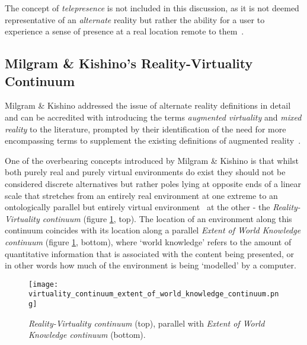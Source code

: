 The concept of \textit{telepresence} is not included in this discussion, as it is not deemed representative of an \textit{alternate} reality but rather the ability for a user to experience a sense of presence at a real location remote to them~\cite{Sheridan1992a}.


\subsection{Milgram \& Kishino's Reality-Virtuality Continuum}
\label{milgram&kishino}
Milgram \& Kishino addressed the issue of alternate reality definitions in detail and can be accredited with introducing the terms \textit{augmented virtuality} and \textit{mixed reality} to the literature, prompted by their identification of the need for more encompassing terms to supplement the existing definitions of augmented reality~\cite{Milgram1994, Milgram1999}.


One of the overbearing concepts introduced by Milgram \& Kishino is that whilst both purely real and purely virtual environments do exist they should not be considered discrete alternatives but rather poles lying at opposite ends of a linear scale that stretches from an entirely real environment at one extreme to an ontologically parallel but entirely virtual environment~\cite{Qvortrup2002} at the other - the \textit{Reality-Virtuality continuum} (figure \ref{reality_virtuality_extent_of_world_knowledge_continuum}, top). The location of an environment along this continuum coincides with its location along a parallel \textit{Extent of World Knowledge continuum} (figure \ref{reality_virtuality_extent_of_world_knowledge_continuum}, bottom), where `world knowledge' refers to the amount of quantitative information that is associated with the content being presented, or in other words how much of the environment is being `modelled' by a computer.

\begin{figure}[h]
\centering
\texttt{[image: virtuality\_continuum\_extent\_of\_world\_knowledge\_continuum.png]}
\caption{\textit{Reality-Virtuality continuum} (top), parallel with \textit{Extent of World Knowledge continuum} (bottom).}
\label{reality_virtuality_extent_of_world_knowledge_continuum}
\end{figure}

